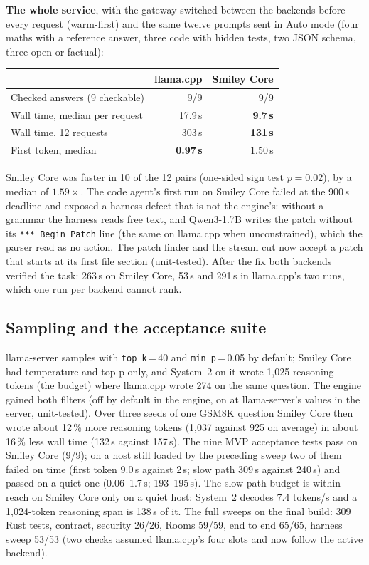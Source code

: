 \textbf{The whole service}, with the gateway switched between the backends before every request (warm-first) and the same twelve
prompts sent in Auto mode (four maths with a reference answer, three code with hidden tests, two JSON schema, three open or
factual):

\begin{center}
\begin{tabular}{lrr}
\hline
 & llama.cpp & Smiley Core \\
\hline
Checked answers (9 checkable) & 9/9 & 9/9 \\
Wall time, median per request & 17.9\,s & \textbf{9.7\,s} \\
Wall time, 12 requests & 303\,s & \textbf{131\,s} \\
First token, median & \textbf{0.97\,s} & 1.50\,s \\
\hline
\end{tabular}
\end{center}

Smiley Core was faster in 10 of the 12 pairs (one-sided sign test $p=0.02$), by a median of $1.59\times$. The code agent's first
run on Smiley Core failed at the 900\,s deadline and exposed a harness defect that is not the engine's: without a grammar the
harness reads free text, and Qwen3-1.7B writes the patch without its \texttt{*** Begin Patch} line (the same on llama.cpp when
unconstrained), which the parser read as no action. The patch finder and the stream cut now accept a patch that starts at
its first file section (unit-tested). After the fix both backends verified the task: 263\,s on Smiley Core, 53\,s and 291\,s in
llama.cpp's two runs, which one run per backend cannot rank.

\subsection{Sampling and the acceptance suite}

llama-server samples with \texttt{top\_k}\,=\,40 and \texttt{min\_p}\,=\,0.05 by default; Smiley Core had temperature and top-p only,
and System~2 on it wrote 1,025 reasoning tokens (the budget) where llama.cpp wrote 274 on the same question. The engine gained
both filters (off by default in the engine, on at llama-server's values in the server, unit-tested). Over three seeds of one
GSM8K question Smiley Core then wrote about 12\,\% more reasoning tokens (1,037 against 925 on average) in about 16\,\% less
wall time (132\,s against 157\,s). The nine MVP acceptance tests pass on Smiley Core (9/9); on a host still loaded by the
preceding sweep two of them failed on time (first token 9.0\,s against 2\,s; slow path 309\,s against 240\,s) and passed on
a quiet one (0.06--1.7\,s; 193--195\,s). The slow-path budget is within reach on Smiley Core only on a quiet host: System~2
decodes 7.4 tokens/s and a 1,024-token reasoning span is 138\,s of it. The full sweeps on the final build: 309 Rust tests,
contract, security 26/26, Rooms 59/59, end to end 65/65, harness sweep 53/53 (two checks assumed llama.cpp's four slots and
now follow the active backend).

